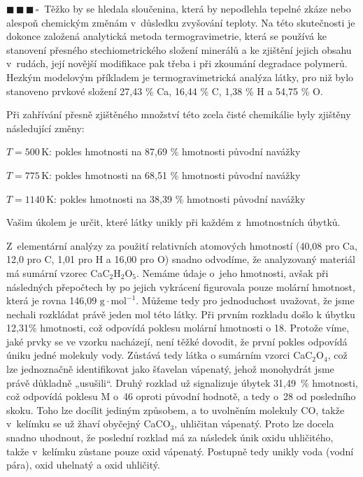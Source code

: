 \documentclass{book}
\newcommand{\tri}{$\blacksquare \, \blacksquare \, \blacksquare \, \square \; \; $}
\renewenvironment{quotation}{\par}{\par} %
\begin{document}
\hrulefill %
\begin{quotation}
\tri Těžko by se hledala sloučenina, která by nepodlehla tepelné zkáze
nebo alespoň chemickým změnám v~důsledku zvyšování teploty. Na této
skutečnosti je dokonce založená analytická metoda termogravimetrie,
která se používá ke stanovení přesného stechiometrického složení minerálů
a ke zjištění jejich obsahu v~rudách, její novější modifikace pak
třeba i při zkoumání degradace polymerů. Hezkým modelovým příkladem
je termogravimetrická analýza látky, pro niž bylo stanoveno prvkové
složení 27,43 \% Ca, 16,44 \% C, 1,38 \% H a 54,75 \% O. 

Při zahřívání přesně zjištěného množství této zcela čisté chemikálie
byly zjištěny následující změny:

$T=500\,\mathrm{K}$: pokles hmotnosti na 87,69 \% hmotnosti původní
navážky 

$T=775\,\mathrm{K}$: pokles hmotnosti na 68,51 \% hmotnosti původní
navážky 

$T=1140\,\mathrm{K}$: pokles hmotnosti na 38,39 \% hmotnosti původní
navážky 

Vašim úkolem je určit, které látky unikly při každém z~hmotnostních
úbytků. 
\end{quotation} \dotfill \par 
Z~elementární analýzy za použití relativních atomových hmotností (40,08
pro Ca, 12,0 pro C, 1,01 pro H a 16,00 pro O) snadno odvodíme, že
analyzovaný materiál má sumární vzorec CaC$_{2}$H$_{2}$O$_{5}$.
Nemáme údaje o~jeho hmotnosti, avšak při následných přepočtech by
po jejich vykrácení figurovala pouze molární hmotnost, která je rovna
146,09 $\mathrm{g\cdot mol^{-1}}$. Můžeme tedy pro jednoduchost uvažovat, že jsme nechali
rozkládat právě jeden mol této látky. Při prvním rozkladu došlo k
úbytku 12,31\% hmotnosti, což odpovídá poklesu molární hmotnosti o
18. Protože víme, jaké prvky se ve vzorku nacházejí, není těžké dovodit,
že první pokles odpovídá úniku jedné molekuly vody. Zůstává tedy látka
o sumárním vzorci CaC$_{2}$O$_{4}$, což lze jednoznačně identifikovat
jako šťavelan vápenatý, jehož monohydrát jsme právě důkladně „usušili“.
Druhý rozklad už signalizuje úbytek 31,49~\% hmotnosti, což odpovídá
poklesu M o~46 oproti původní hodnotě, a tedy o~28 od posledního skoku.
Toho lze docílit jediným způsobem, a to uvolněním molekuly CO, takže
v~kelímku se už žhaví obyčejný CaCO$_3$, uhličitan vápenatý. Proto lze
docela snadno uhodnout, že poslední rozklad má za následek únik oxidu
uhličitého, takže v~kelímku zůstane pouze oxid vápenatý. Postupně
tedy unikly voda (vodní pára), oxid uhelnatý a oxid uhličitý. 
\end{document}

